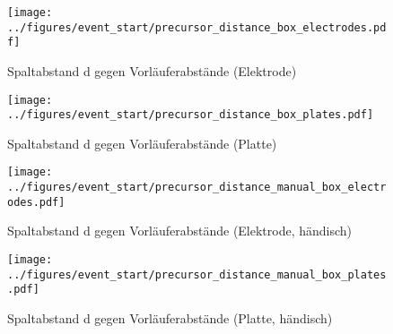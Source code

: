 \begin{figure}[htbp]
    \centering
    \begin{minipage}[t]{0.47\textwidth}
      \centering
      \texttt{[image: ../figures/event\_start/precursor\_distance\_box\_electrodes.pdf]}
      \caption{Spaltabstand d gegen Vorläuferabstände (Elektrode)}
      \label{fig:box-precdistance-electrode}
   \end{minipage}
 \begin{minipage}[t]{0.47\textwidth}
      \centering
      \texttt{[image: ../figures/event\_start/precursor\_distance\_box\_plates.pdf]}
      \caption{Spaltabstand d gegen Vorläuferabstände (Platte)}
      \label{fig:box-precdistance-plate}
  \end{minipage}
\begin{minipage}[t]{0.47\textwidth}
      \centering
      \texttt{[image: ../figures/event\_start/precursor\_distance\_manual\_box\_electrodes.pdf]}
      \caption{Spaltabstand d gegen Vorläuferabstände (Elektrode, händisch)}
      \label{fig:box-precdistance-electrode-hand}
   \end{minipage}
 \begin{minipage}[t]{0.47\textwidth}
      \centering
      \texttt{[image: ../figures/event\_start/precursor\_distance\_manual\_box\_plates.pdf]}
      \caption{Spaltabstand d gegen Vorläuferabstände (Platte, händisch)}
      \label{fig:box-precdistance-plate-hand}
  \end{minipage}

\end{figure}


